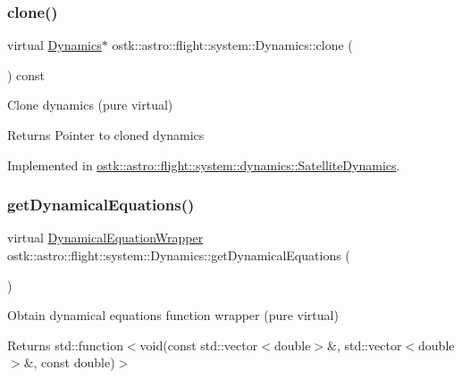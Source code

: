 \subsubsection{\texorpdfstring{clone()}{clone()}}
{\footnotesize\ttfamily virtual \hyperlink{classostk_1_1astro_1_1flight_1_1system_1_1_dynamics}{Dynamics}$\ast$ ostk\+::astro\+::flight\+::system\+::\+Dynamics\+::clone (\begin{DoxyParamCaption}{ }\end{DoxyParamCaption}) const\hspace{0.3cm}{\ttfamily [pure virtual]}}



Clone dynamics (pure virtual) 

\begin{DoxyReturn}{Returns}
Pointer to cloned dynamics 
\end{DoxyReturn}


Implemented in \hyperlink{classostk_1_1astro_1_1flight_1_1system_1_1dynamics_1_1_satellite_dynamics_a57d066e3876e999e288d00a23fb9ec9c}{ostk\+::astro\+::flight\+::system\+::dynamics\+::\+Satellite\+Dynamics}.

\mbox{\label{classostk_1_1astro_1_1flight_1_1system_1_1_dynamics_a2001816629758bad7e960af54e87ddaa}} 
\subsubsection{\texorpdfstring{get\+Dynamical\+Equations()}{getDynamicalEquations()}}
{\footnotesize\ttfamily virtual \hyperlink{classostk_1_1astro_1_1flight_1_1system_1_1_dynamics_a9b14f4fbea6fe1e96af9e71545d4c77e}{Dynamical\+Equation\+Wrapper} ostk\+::astro\+::flight\+::system\+::\+Dynamics\+::get\+Dynamical\+Equations (\begin{DoxyParamCaption}{ }\end{DoxyParamCaption})\hspace{0.3cm}{\ttfamily [pure virtual]}}



Obtain dynamical equations function wrapper (pure virtual) 

\begin{DoxyReturn}{Returns}
std\+::function$<$void(const std\+::vector$<$double$>$\&, std\+::vector$<$double$>$\&, const double)$>$ 
\end{DoxyReturn}


